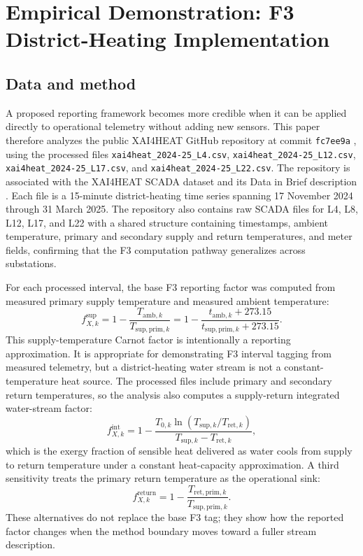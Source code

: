 \documentclass[11pt]{article}
\begin{document}
\section{Empirical Demonstration: F3 District-Heating Implementation}

\subsection{Data and method}

A proposed reporting framework becomes more credible when it can be applied directly to operational telemetry without adding new sensors. This paper therefore analyzes the public XAI4HEAT GitHub repository at commit \texttt{fc7ee9a} \cite{xai4heatgithub}, using the processed files \texttt{xai4heat\_2024-25\_L4.csv}, \texttt{xai4heat\_2024-25\_L12.csv}, \texttt{xai4heat\_2024-25\_L17.csv}, and \texttt{xai4heat\_2024-25\_L22.csv}. The repository is associated with the XAI4HEAT SCADA dataset and its Data in Brief description \cite{xai4heat2024,cvetkovic2025}. Each file is a 15-minute district-heating time series spanning 17 November 2024 through 31 March 2025. The repository also contains raw SCADA files for L4, L8, L12, L17, and L22 with a shared structure containing timestamps, ambient temperature, primary and secondary supply and return temperatures, and meter fields, confirming that the F3 computation pathway generalizes across substations.

For each processed interval, the base F3 reporting factor was computed from measured primary supply temperature and measured ambient temperature:
\begin{equation}
f_{X,k}^{\mathrm{sup}}=1-\frac{T_{\mathrm{amb},k}}{T_{\mathrm{sup,prim},k}}=1-\frac{t_{\mathrm{amb},k}+273.15}{t_{\mathrm{sup,prim},k}+273.15}.
\end{equation}
This supply-temperature Carnot factor is intentionally a reporting approximation. It is appropriate for demonstrating F3 interval tagging from measured telemetry, but a district-heating water stream is not a constant-temperature heat source. The processed files include primary and secondary return temperatures, so the analysis also computes a supply-return integrated water-stream factor:
\begin{equation}
f_{X,k}^{\mathrm{int}}=1-\frac{T_{0,k}\ln(T_{\mathrm{sup},k}/T_{\mathrm{ret},k})}{T_{\mathrm{sup},k}-T_{\mathrm{ret},k}},
\end{equation}
which is the exergy fraction of sensible heat delivered as water cools from supply to return temperature under a constant heat-capacity approximation. A third sensitivity treats the primary return temperature as the operational sink:
\begin{equation}
f_{X,k}^{\mathrm{return}}=1-\frac{T_{\mathrm{ret,prim},k}}{T_{\mathrm{sup,prim},k}}.
\end{equation}
These alternatives do not replace the base F3 tag; they show how the reported factor changes when the method boundary moves toward a fuller stream description.
\end{document}
